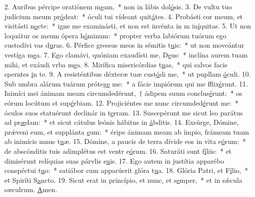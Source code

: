 2. Auribus pércipe oratiónem m\uline{e}am,~* non in lábis dol\uline{ó}sis.
3. De vultu tuo judícium meum pr\uline{ó}deat:~* óculi tui vídeant quit\uline{á}tes.
4. Probásti cor meum, et visitásti n\uline{o}cte:~* igne me examinásti, et non est invénta in m in\uline{í}quitas.
5. Ut non loquátur os meum ópera h\uline{ó}minum:~* propter verba labiórum tuórum ego custodívi vas d\uline{u}ras.
6. Pérfice gressus meos in sémitis t\uline{u}is:~* ut non moveántur vestíga m\uline{e}a.
7. Ego clamávi, quóniam exaudísti me, D\uline{e}us:~* inclína aurem tuam mihi, et exáudi vrba m\uline{e}a.
8. Mirífica misericórdias t\uline{u}as,~* qui salvos facis sperntes \uline{i}n te.
9. A resisténtibus déxteræ tuæ cust\uline{ó}di me,~* ut pupllam \uline{ó}culi.
10. Sub umbra alárum tuárum próteg\uline{e} me:~* a fácie impiórum qui me fflix\uline{é}runt.
11. Inimíci mei ánimam meam circumdedérunt,~† ádipem suum conclus\uline{é}runt:~* os eórum locútum st sup\uline{é}rbiam.
12. Projiciéntes me nunc circumded\uline{é}runt me:~* óculos suos statuérunt declinár in t\uline{e}rram.
13. Suscepérunt me sicut leo parátus ad pr\uline{æ}dam:~* et sicut cátulus leónis hábitns in \uline{á}bditis.
14. Exsúrge, Dómine, prǽveni eum, et supplánta \uline{e}um:~* éripe ánimam meam ab ímpio, frámeam tuam ab inimícis mnus t\uline{u}æ.
15. Dómine, a paucis de terra dívide eos in vita e\uline{ó}rum:~* de abscónditis tuis adimplétus est ventr e\uline{ó}rum.
16. Saturáti sunt f\uline{í}liis:~* et dimisérunt relíquias suas párvlis s\uline{u}is.
17. Ego autem in justítia apparébo conspéctui t\uline{u}o:~* satiábor cum apparúerit glóra t\uline{u}a.
18. Glória Patri, et F\uline{í}lio,~* et Spiríti S\uline{a}ncto.
19. Sicut erat in princípio, et nunc, et s\uline{e}mper,~* et in sǽcula sæculrum. \uline{A}men.
